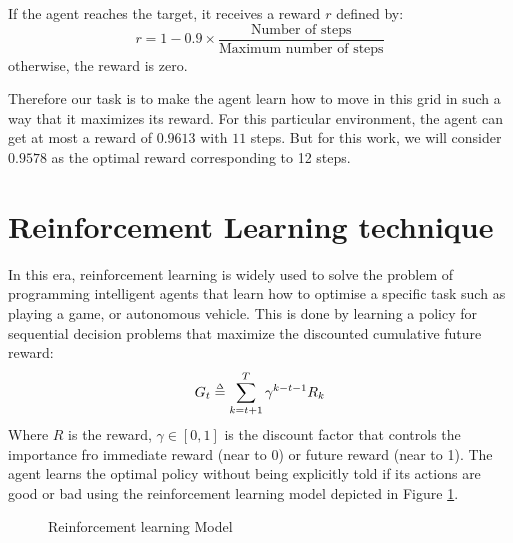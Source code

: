 If the agent reaches the target, it receives a reward $r$ defined by:
\begin{equation}
	r = 1 - 0.9\times \frac{\text{Number of steps}}{\text{Maximum number of steps}}
\end{equation}
otherwise, the reward is zero.


Therefore our task is to make the agent learn how to move in this grid in such a way that it maximizes its reward. For this particular environment, the agent can get at most a reward of $0.9613$ with $11$ steps. But for this work, we will consider $0.9578$ as the optimal reward corresponding to 12 steps.

\section{Reinforcement Learning technique}
In this era, reinforcement learning is widely used to solve the problem of programming intelligent agents that learn how to optimise a specific task such as playing a game, or autonomous vehicle. This is done by learning a policy for sequential decision problems that maximize the discounted  cumulative future reward:
\begin{equation}
	G_t \overset{\scriptscriptstyle\Delta}{=} \sum_{k=t+1}^{T} \gamma^{k-t-1}R_k
\end{equation}
Where $R$ is the reward, $\gamma\in [0,1]$ is the discount factor that controls the importance fro immediate reward (near to 0) or future reward (near to 1). The agent learns the optimal policy without being explicitly told if its actions are good or bad using the reinforcement learning model depicted in Figure \ref{fig:RL}.


\begin{figure}
	\centering
	\caption{Reinforcement learning Model}
	\label{fig:RL}
\end{figure}

